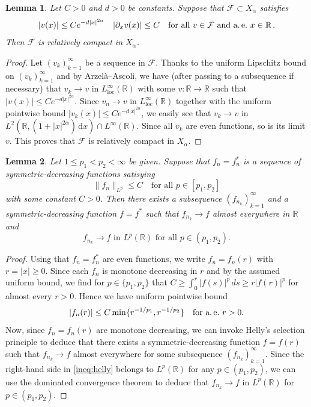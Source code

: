 \documentclass[reqno,10pt,a4paper]{amsart}
\newtheorem{lem}{Lemma}[section]
\theoremstyle{definition}
\theoremstyle{definition}
\theoremstyle{remark}
\theoremstyle{remark}
\numberwithin{equation}{section}
\newcommand{\R}{\mathbb{R}}
\newcommand{\pt}{\partial}
\newcommand{\be}{\begin{equation}}
\newcommand{\ee}{\end{equation}}
\newcommand{\eu}{e}
\newcommand{\Lloc}{L_{\mathrm{loc}}}
\newcommand{\df}{\mathrm{d}}
\begin{document}
\begin{appendix}
\begin{lem} \label{lem:compact}
Let $C > 0$ and $d >0$ be constants. Suppose that $\mathcal{F} \subset X_\alpha$ satisfies
$$
|v(x)| \leq C \eu^{-d |x|^{2 \alpha}} \quad |\pt_x v(x)| \leq C \quad \mbox{for all $v \in \mathcal{F}$ and a.\,e.~$x \in \R$} \, .
$$
Then $\mathcal{F}$ is relatively compact in $X_\alpha$. 
\end{lem}

\begin{proof}
Let $(v_k)_{k=1}^\infty$ be a sequence in $\mathcal{F}$. Thanks to the uniform Lipschitz bound on $(v_k)_{k=1}^\infty$ and by Arzel\`a--Ascoli, we have (after passing to a subsequence if necessary) that $v_k \to v$ in $\Lloc^\infty(\R)$ with some $v : \R \to \R$ such that $|v(x)| \leq C \eu^{-d |x|^{2 \alpha}}$. Since $v_n \to v$ in $\Lloc^\infty(\R)$ together with the uniform pointwise bound $|v_k(x)| \leq C \eu^{-d |x|^{2 \alpha}}$, we easily see that $v_k \to v$ in $L^2(\R, (1+|x|^{2 \alpha}) \, \df x) \cap L^\infty(\R)$.  Since all $v_k$ are even functions, so is its limit $v$. This proves that $\mathcal{F}$ is relatively compact in $X_\alpha$.
\end{proof}

\begin{lem} \label{lem:helly}
Let $1 \leq p_1 < p_2 < \infty$ be given. Suppose that $f_n=f_n^*$ is a sequence of symmetric-decreasing functions satisying
$$
\| f_n \|_{L^p} \leq C \quad \mbox{for all $p \in [p_1, p_2]$}
$$ 
with some constant $C>0$. Then there exists a subsequence $(f_{n_k})_{k=1}^\infty$ and a symmetric-decreasing function $f=f^*$ such that $f_{n_k} \to f$ almost everywhere in $\R$ and
$$
\mbox{$f_{n_k} \to f$ in $L^p(\R)$ for all $p \in (p_1, p_2)$}.
$$
\end{lem}

\begin{proof}
Using that $f_n=f_n^*$ are even functions, we write $f_n = f_n(r)$ with $r=|x| \geq 0$. Since each $f_n$ is monotone decreasing in $r$ and by the assumed uniform bound, we find for $p \in \{ p_1, p_2\}$ that $C \geq \int_{0}^r |f(s)|^p \, ds \geq r |f(r)|^p$ for almost every $r > 0$. Hence we have uniform pointwise bound
\be \label{ineq:helly}
|f_n(r)| \leq C \min \{ r^{-1/p_1}, r^{-1/p_2} \} \quad \mbox{for a.\,e.~$r> 0$}.
\ee
Now, since $f_n=f_n(r)$ are monotone decreasing, we can invoke Helly's selection principle to deduce that there exists a symmetric-decreasing function $f=f(r)$ such that $f_{n_k} \to f$ almost everywhere for some subsequence $(f_{n_k})_{k=1}^\infty$. Since the right-hand side in \eqref{ineq:helly} belongs to $L^p(\R)$ for any $p \in (p_1,p_2)$, we can use the dominated convergence theorem to deduce that $f_{n_k} \to f$ in $L^p(\R)$ for $p \in (p_1, p_2)$.
\end{proof}



\end{appendix}
\end{document}

